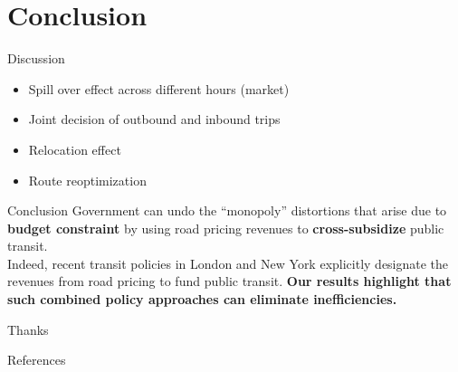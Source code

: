 \documentclass[10pt, aspectratio=169]{beamer}
\begin{document}
\section{Conclusion}
\begin{frame}{Discussion}
  \begin{itemize}
    \item Spill over effect across different hours (market)
    \item Joint decision of outbound and inbound trips
    \item Relocation effect
    \item Route reoptimization
  \end{itemize}
\end{frame}
\begin{frame}{Conclusion}
  Government can undo the “monopoly” distortions that arise due to \textbf{budget constraint} by using road pricing revenues to \textbf{cross-subsidize} public transit.\\
  Indeed, recent transit policies in London and New York explicitly designate the revenues from road pricing to fund public transit. \textbf{Our results highlight that such
    combined policy approaches can eliminate inefficiencies.}

\end{frame}

{
\begin{frame}[standout]
  Thanks
\end{frame}
}

\appendix

\begin{frame}[allowframebreaks]{References}

  
  

\end{frame}
\end{document}

